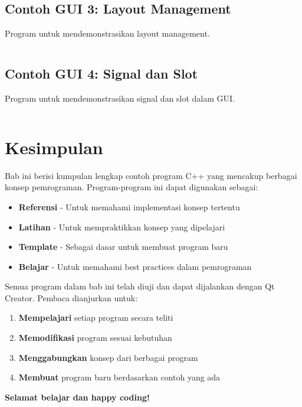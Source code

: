 \subsection{Contoh GUI 3: Layout Management}

Program untuk mendemonstrasikan layout management.

\begin{lstlisting}[language=c++, caption=Layout Management]

\end{lstlisting}

\subsection{Contoh GUI 4: Signal dan Slot}

Program untuk mendemonstrasikan signal dan slot dalam GUI.

\begin{lstlisting}[language=c++, caption=Signal dan Slot dalam GUI]

\end{lstlisting}

\section{Kesimpulan}

Bab ini berisi kumpulan lengkap contoh program C++ yang mencakup berbagai konsep pemrograman. Program-program ini dapat digunakan sebagai:

\begin{itemize}
\item \textbf{Referensi} - Untuk memahami implementasi konsep tertentu
\item \textbf{Latihan} - Untuk mempraktikkan konsep yang dipelajari
\item \textbf{Template} - Sebagai dasar untuk membuat program baru
\item \textbf{Belajar} - Untuk memahami best practices dalam pemrograman
\end{itemize}

Semua program dalam bab ini telah diuji dan dapat dijalankan dengan Qt Creator. Pembaca dianjurkan untuk:

\begin{enumerate}
\item \textbf{Mempelajari} setiap program secara teliti
\item \textbf{Memodifikasi} program sesuai kebutuhan
\item \textbf{Menggabungkan} konsep dari berbagai program
\item \textbf{Membuat} program baru berdasarkan contoh yang ada
\end{enumerate}

\begin{center}
\textbf{Selamat belajar dan happy coding!} 🚀
\end{center}